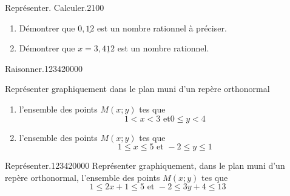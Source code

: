 \begin{pageParcourst}
\begin{ExoCtN}{Représenter. Calculer.}{2}{1}{0}{0} 

\begin{enumerate}
\item Démontrer que $0,\underline{12}$ est un nombre rationnel à préciser.
\item Démontrer que $x=3,\underline{412}$ est un nombre rationnel. 
\end{enumerate}
\end{ExoCtN} 

\begin{ExoCt}{Raisonner.}{1234}{2}{0}{0}{0}{0}
 
Représenter graphiquement dans le plan muni d'un repère orthonormal 
 
\begin{enumerate}
\item l'ensemble des points $M(x;y)$ tes que  $$1 < x < 3 \text{ et} 0 \leq y <4$$
\item l'ensemble des points $M(x;y)$ tes que  $$1 \leq  x \leq  5 \text{ et } -2 \leq y   \leq  1$$
\end{enumerate}
 
\end{ExoCt}

\begin{ExoCt}{Représenter.}{1234}{2}{0}{0}{0}{0}
Représenter graphiquement, dans le plan muni d'un repère orthonormal, l'ensemble des points $M(x;y)$ tes que  $$1 \leq  2x+1 \leq  5 \text{ et }  -2 \leq 3y + 4  \leq  13$$
\end{ExoCt} 
 
\end{pageParcourst} %



